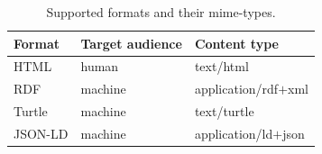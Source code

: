 \documentclass[draft,final]{vutinfth} %
\begin{document}
\begin{table}
  \centering
  \begin{tabular}{| l | l | l |}
    \hline 
       Format & Target audience & Content type \\ \hline \hline
       HTML & human & text/html \\ \hline
       RDF & machine & application/rdf$+$xml \\ \hline
       Turtle & machine & text/turtle \\ \hline
       JSON-LD & machine & application/ld$+$json \\ \hline
  \end{tabular}
  \caption{Supported formats and their mime-types.}
  \label{tab:olution-architectural-prototype:format-table}
\end{table}
\end{document}
